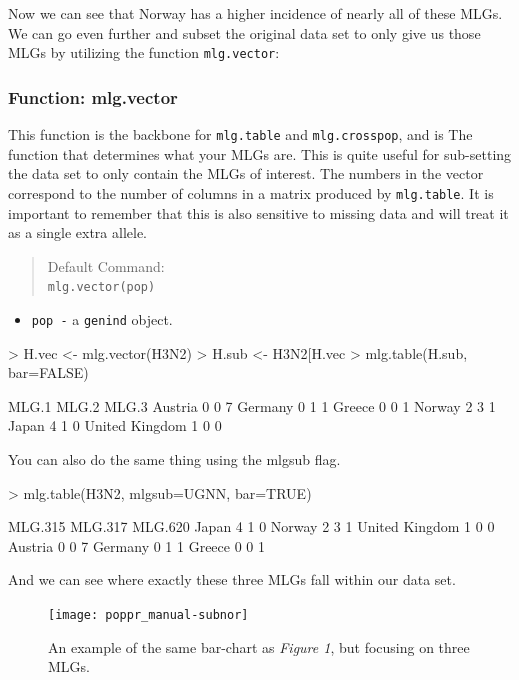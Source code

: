 \documentclass[letterpaper]{article}
\newcommand{\tab}{\hspace*{1em}}
\begin{document}
Now we can see that Norway has a higher incidence of nearly all of these MLGs. 
We can go even further and subset the original data set to only give us those MLGs by utilizing the function \texttt{mlg.vector}:
\subsubsection{Function: mlg.vector}

\tab\tab This function is the backbone for \texttt{mlg.table} and \texttt{mlg.crosspop}, and is The function that determines what your MLGs are. This is quite useful for sub-setting the data set to only contain the MLGs of interest. The numbers in the vector correspond to the number of columns in a matrix produced by \texttt{mlg.table}. It is important to remember that this is also sensitive to missing data and will treat it as a single extra allele. 
\begin{quote}
Default Command:\\
\texttt{mlg.vector(pop)}
\end{quote}
  \begin{itemize}
    \item \texttt{pop -} a \texttt{genind} object.
  \end{itemize}
\begin{Schunk}
\begin{Sinput}
> H.vec <- mlg.vector(H3N2)
> H.sub <- H3N2[H.vec %
> mlg.table(H.sub, bar=FALSE)
\end{Sinput}
\begin{Soutput}
               MLG.1 MLG.2 MLG.3
Austria            0     0     7
Germany            0     1     1
Greece             0     0     1
Norway             2     3     1
Japan              4     1     0
United Kingdom     1     0     0
\end{Soutput}
\end{Schunk}
You can also do the same thing using the mlgsub flag.
\begin{Schunk}
\begin{Sinput}
> mlg.table(H3N2, mlgsub=UGNN, bar=TRUE)
\end{Sinput}
\end{Schunk}
\begin{Schunk}
\begin{Soutput}
               MLG.315 MLG.317 MLG.620
Japan                4       1       0
Norway               2       3       1
United Kingdom       1       0       0
Austria              0       0       7
Germany              0       1       1
Greece               0       0       1
\end{Soutput}
\end{Schunk}
And we can see where exactly these three MLGs fall within our data set.
\begin{figure}[h!]
  \centering
  \caption{An example of the same bar-chart as \textit{Figure 1}, but focusing on three MLGs.}
  \label{nortable2}
\texttt{[image: poppr\_manual-subnor]}
\end{figure}
\\
\end{document}
